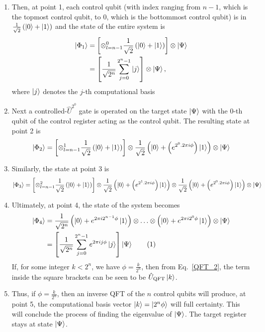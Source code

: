 \documentclass[12pt,oneside]{book}
\newcommand\numberthis{\addtocounter{equation}{1}\tag{\theequation}}
\begin{document}
\begin{enumerate}
    \item Then, at point 1, each control qubit (with index ranging from $n-1$, which is the topmost control qubit, to 0, which is the bottommost control qubit) is in $\frac{1}{\sqrt{2}}\left(\ket{0}+\ket{1}\right)$ and the state of the entire system is
    \begin{align*}
        \ket{\Phi_1}&{}=\left[\otimes_{l=n-1}^{0}\frac{1}{\sqrt{2}}\left(\ket{0}+\ket{1}\right)\right]\otimes\ket{\Psi}\\
        &{}=\left[\frac{1}{\sqrt{2^n}}\sum_{j=0}^{2^n-1}\ket{j}\right]\otimes\ket{\Psi},
    \end{align*}
    where $\ket{j}$ denotes the $j$-th computational basis
    \item Next a controlled-$\hat{U}^{2^0}$ gate is operated on the target state $\ket{\Psi}$ with the $0$-th qubit of the control register acting as the control qubit. The resulting state at point 2 is
    \begin{align*}
        \ket{\Phi_2}=\left[\otimes_{l=n-1}^{1}\frac{1}{\sqrt{2}}\left(\ket{0}+\ket{1}\right)\right] \otimes \frac{1}{\sqrt{2}}\left(\ket{0}+\left(e^{2^0 . 2\pi i \phi}\right)\ket{1}\right) \otimes \ket{\Psi}
    \end{align*}
    \item Similarly, the state at point 3 is
    \begin{align*}
        \ket{\Phi_3}=\left[\otimes_{l=n-1}^{2}\frac{1}{\sqrt{2}}\left(\ket{0}+\ket{1}\right)\right] \otimes \frac{1}{\sqrt{2}}\left(\ket{0}+\left(e^{2^1 . 2\pi i \phi}\right)\ket{1}\right) \otimes \frac{1}{\sqrt{2}}\left(\ket{0}+\left(e^{2^0 . 2\pi i \phi}\right)\ket{1}\right) \otimes \ket{\Psi}
    \end{align*}
    \item Ultimately, at point 4, the state of the system becomes
    \begin{align*}\label{QPE_4}
        \ket{\Phi_4}&{}= \frac{1}{\sqrt{2^n}}\left(\ket{0}+e^{2\pi i 2^{n-1}\phi}\ket{1}\right)\otimes\hdots\otimes \left(\ket{0}+e^{2\pi i 2^0\phi}\ket{1}\right)\otimes \ket{\Psi}\\
        &{}= \left[\frac{1}{\sqrt{2^n}} \sum_{j=0}^{2^n-1}e^{2\pi i j \phi}\ket{j}\right]\ket{\Psi}\numberthis
    \end{align*}
    If, for some integer $k<2^n$, we have $\phi=\frac{k}{2^n}$, then from Eq.~\ref{QFT_2}, the term inside the square brackets can be seen to be $\hat{U}_{\mathrm{QFT}}\ket{k}$.
    \item Thus, if $\phi=\frac{k}{2^n}$, then an inverse QFT of the $n$ control qubits will produce, at point 5, the computational basis vector $\ket{k}=\ket{2^n\phi}$ will full certainty. This will conclude the process of finding the eigenvalue of $\ket{\Psi}$. The target register stays at state $\ket{\Psi}$.


\end{enumerate}
\end{document}
